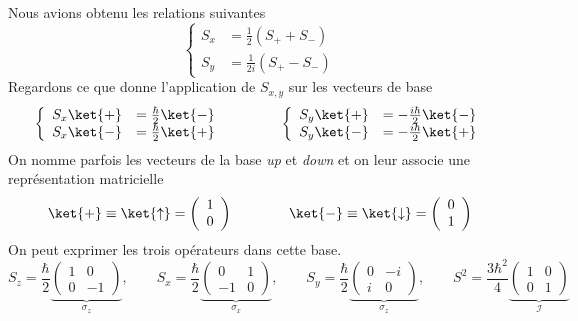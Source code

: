 	Nous avions obtenu les relations suivantes	
	\begin{equation}
	\left\{\begin{array}{ll}
	S_x &= \frac{1}{2}(S_++S_-)\\
	S_y &= \frac{1}{2i}(S_+-S_-)	
	\end{array}\right.
	\end{equation}
	Regardons ce que donne l'application de $S_{x,y}$ sur les vecteurs de base
	\begin{equation}
	\left\{\begin{array}{ll}
	S_x\ket{+} &= \frac{\hbar}{2}\ket{-}\\
	S_x\ket{-} &= \frac{\hbar}{2}\ket{+}	
	\end{array}\right.\qquad\qquad\left\{\begin{array}{ll}
	S_y\ket{+} &= -\frac{i\hbar}{2}\ket{-}\\
	S_y\ket{-} &= -\frac{i\hbar}{2}\ket{+}	
	\end{array}\right.
	\end{equation}
	On nomme parfois les vecteurs de la base \textit{up} et \textit{down} et on leur associe 
	une représentation matricielle
	\begin{equation}
	\ket{+} \equiv \ket{\uparrow} = \left(\begin{array}{c}
	1\\
	0
	\end{array}\right)\qquad\qquad\ket{-} \equiv \ket{\downarrow} = \left(\begin{array}{c}
	0\\
	1
	\end{array}\right)
	\end{equation}
	On peut exprimer les trois opérateurs dans cette base. 
	\begin{equation}
	S_z = \dfrac{\hbar}{2}\underbrace{\left(\begin{array}{cc}
	1 & 0\\
	0 & -1
	\end{array}\right)}_{\sigma_z},\qquad S_x = \dfrac{\hbar}{2}\underbrace{\left(\begin{array}{cc}
	0 & 1\\
	-1 & 0
	\end{array}\right)}_{\sigma_x},\qquad S_y = \dfrac{\hbar}{2}\underbrace{\left(\begin{array}{cc}
	0 & -i\\
	i & 0
	\end{array}\right)}_{\sigma_z},\qquad S^2  = \dfrac{3\hbar^2}{4}\underbrace{\left(\begin{array}{cc}
	1 & 0\\
	0 & 1
	\end{array}\right)}_{\mathcal{I}}
	\end{equation}
